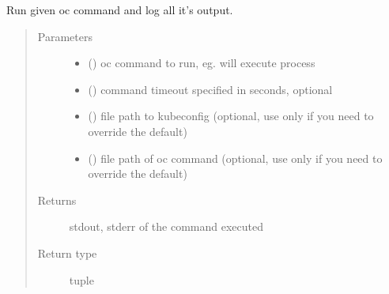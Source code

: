 \documentclass[letterpaper,10pt,english]{sphinxmanual}
\begin{document}
\begin{fulllineitems}
\label{\detokenize{ocpnetsplit:ocpnetsplit.ocp.run_oc}}
Run given oc command and log all it’s output.
\begin{quote}\begin{description}
\item[{Parameters}] \leavevmode\begin{itemize}
\item {} 
 () \textendash{} oc command to run, eg.  will
execute  process

\item {} 
 () \textendash{} command timeout specified in seconds, optional

\item {} 
 () \textendash{} file path to kubeconfig (optional, use only if you
need to override the default)

\item {} 
 () \textendash{} file path of oc command (optional, use only if
you need to override the default)

\end{itemize}

\item[{Returns}] \leavevmode
stdout, stderr of the command executed

\item[{Return type}] \leavevmode
tuple

\end{description}\end{quote}

\end{fulllineitems}

\end{document}
